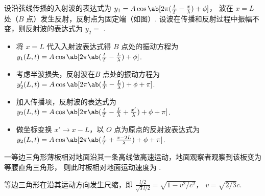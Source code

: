 \documentclass[quiet]{ctexart}
\begin{document}
\begin{textfig}[4:1]
  \begin{problem}
    设沿弦线传播的入射波的表达式为
    $y_1 = A\cos\ab[2\pi(\frac tT - \frac x\lambda) + \phi]$，
    波在 $x = L$ 处（$B$ 点）发生反射，反射点为固定端（如图）.
    设波在传播和反射过程中振幅不变，则反射波的表达式为 $y_2 = $
    .
  \end{problem}
  \textfigsplit \centering
\end{textfig}
\begin{solution}\leavevmode
  \begin{itemize}
    \item 将 $x = L$ 代入入射波表达式得 $B$ 点处的振动方程为
    $y_1(L,t) = A\cos\ab[2\pi\ab(\frac tT - \frac L\lambda) + \phi]$.
    \item 考虑半波损失，反射波在$B$ 点处的振动方程为
    $y_2'(L,t) = A\cos\ab[2\pi\ab(\frac tT - \frac L\lambda) + \phi + \pi]$.
    \item 加入传播项，反射波的表达式为
    $y_2(L,t) = A\cos\ab[2\pi\ab(\frac tT - \frac L\lambda + \frac {x'}\lambda) + \phi + \pi]$.
    \item 做坐标变换 $x' \to x - L$，以 $O$ 点为原点的反射波表达式为
    $y_2(L,t) = A\cos\ab[2\pi\ab(\frac tT + \frac {x - 2L}\lambda) + \phi + \pi]$.
  \end{itemize}
\end{solution}

\begin{problem}
  一等边三角形薄板相对地面沿其一条高线做高速运动，地面观察者观察到该板变为等腰直角三角形，
  则此时板相对地面运动速度为 .
\end{problem}
\begin{solution}
  等边三角形在沿其运动方向发生尺缩，即 $\frac{l/2}{\sqrt3l/2} = \sqrt{1 - v^2/c^2}$，
  $v = \sqrt{2/3}c$.
\end{solution}
\end{document}
